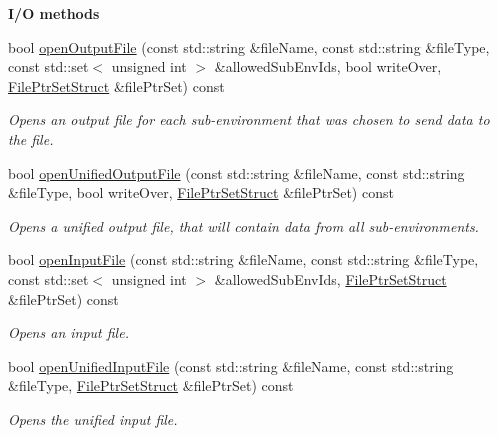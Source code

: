 \begin{Indent}{\bf I/\-O methods}\par
\begin{DoxyCompactItemize}
\item 
bool \hyperlink{class_q_u_e_s_o_1_1_base_environment_ab8fe853074f12ea34e18724119a2fc75}{open\-Output\-File} (const std\-::string \&file\-Name, const std\-::string \&file\-Type, const std\-::set$<$ unsigned int $>$ \&allowed\-Sub\-Env\-Ids, bool write\-Over, \hyperlink{struct_q_u_e_s_o_1_1_file_ptr_set_struct}{File\-Ptr\-Set\-Struct} \&file\-Ptr\-Set) const 
\begin{DoxyCompactList}\small\item\em Opens an output file for each sub-\/environment that was chosen to send data to the file. \end{DoxyCompactList}\item 
bool \hyperlink{class_q_u_e_s_o_1_1_base_environment_ad4dd93dbcb8d2f9ef79af9afaec00aa5}{open\-Unified\-Output\-File} (const std\-::string \&file\-Name, const std\-::string \&file\-Type, bool write\-Over, \hyperlink{struct_q_u_e_s_o_1_1_file_ptr_set_struct}{File\-Ptr\-Set\-Struct} \&file\-Ptr\-Set) const 
\begin{DoxyCompactList}\small\item\em Opens a unified output file, that will contain data from all sub-\/environments. \end{DoxyCompactList}\item 
bool \hyperlink{class_q_u_e_s_o_1_1_base_environment_a8a3f76733a31991a1ed9a942feb2dc3c}{open\-Input\-File} (const std\-::string \&file\-Name, const std\-::string \&file\-Type, const std\-::set$<$ unsigned int $>$ \&allowed\-Sub\-Env\-Ids, \hyperlink{struct_q_u_e_s_o_1_1_file_ptr_set_struct}{File\-Ptr\-Set\-Struct} \&file\-Ptr\-Set) const 
\begin{DoxyCompactList}\small\item\em Opens an input file. \end{DoxyCompactList}\item 
bool \hyperlink{class_q_u_e_s_o_1_1_base_environment_acc1fb3152068b25e84845a0d6d203bcf}{open\-Unified\-Input\-File} (const std\-::string \&file\-Name, const std\-::string \&file\-Type, \hyperlink{struct_q_u_e_s_o_1_1_file_ptr_set_struct}{File\-Ptr\-Set\-Struct} \&file\-Ptr\-Set) const 
\begin{DoxyCompactList}\small\item\em Opens the unified input file. \end{DoxyCompactList}\item 

\end{DoxyCompactItemize}
\end{Indent}
